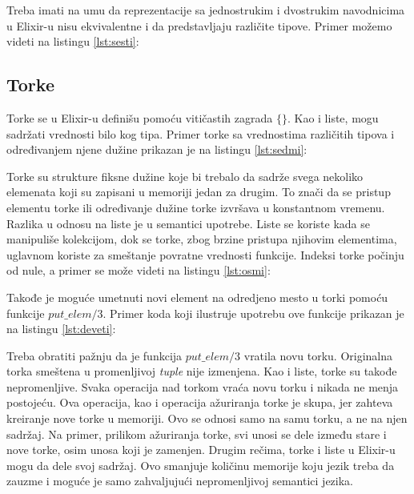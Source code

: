 \documentclass[12pt,oneside]{memoir}
\begin{document}
Treba imati na umu da reprezentacije sa jednostrukim i dvostrukim navodnicima u Elixir-u nisu ekvivalentne i da predstavljaju različite tipove. Primer možemo videti na listingu \ref{lst:sesti}:



\subsection{Torke}

Torke se u Elixir-u definišu pomoću vitičastih zagrada $\{\}$. Kao i liste, mogu sadržati vrednosti bilo kog tipa. Primer torke sa vrednostima različitih tipova i određivanjem njene dužine prikazan je na listingu \ref{lst:sedmi}:



Torke su strukture fiksne dužine koje bi trebalo da sadrže svega nekoliko elemenata koji su zapisani u memoriji jedan za drugim. To znači da se pristup elementu torke ili određivanje dužine torke izvršava u konstantnom vremenu. Razlika u odnosu na liste je u semantici upotrebe. Liste se koriste kada se manipuliše kolekcijom, dok se torke, zbog brzine pristupa njihovim elementima, uglavnom koriste za smeštanje povratne vrednosti funkcije. Indeksi torke počinju od nule, a primer se može videti na listingu \ref{lst:osmi}:



Takođe je moguće umetnuti novi element na odredjeno mesto u torki pomoću funkcije $put\_elem/3$. Primer koda koji ilustruje upotrebu ove funkcije prikazan je na listingu \ref{lst:deveti}:



Treba obratiti pažnju da je funkcija $put\_elem/3$ vratila novu torku. Originalna torka smeštena u promenljivoj \textit{tuple} nije izmenjena. Kao i liste, torke su takođe nepromenljive. Svaka operacija nad torkom vraća novu torku i nikada ne menja postojeću. Ova operacija, kao i operacija ažuriranja torke je skupa, jer zahteva kreiranje nove torke u memoriji. Ovo se odnosi samo na samu torku, a ne na njen sadržaj. Na primer, prilikom ažuriranja torke, svi unosi se dele između stare i nove torke, osim unosa koji je zamenjen. Drugim rečima, torke i liste u Elixir-u mogu da dele svoj sadržaj. Ovo smanjuje količinu memorije koju jezik treba da zauzme i moguće je samo zahvaljujući nepromenljivoj semantici jezika.
\end{document}
